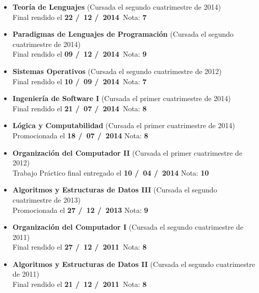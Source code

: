 \begin{itemize}[leftmargin=0.8cm]
  \item{\textbf{Teoría de Lenguajes} (Cursada el segundo cuatrimestre de 2014)\\
  Final rendido el \textbf{22 \slash \ 12 \slash \ 2014}\  \hfill Nota: \textbf{7}}

  \item{\textbf{Paradigmas de Lenguajes de Programación} (Cursada el segundo cuatrimestre de 2014)\\
  Final rendido el \textbf{09 \slash \ 12 \slash \ 2014}\  \hfill Nota: \textbf{9}}

  \item{\textbf{Sistemas Operativos} (Cursada el segundo cuatrimestre de 2012)\\
  Final rendido el \textbf{10 \slash \ 09 \slash \ 2014}\  \hfill Nota: \textbf{7}}

  \item{\textbf{Ingeniería de Software I} (Cursada el primer cuatrimestre de 2014)\\
  Final rendido el \textbf{21 \slash \ 07 \slash \ 2014}\  \hfill Nota: \textbf{8}}

  \item{\textbf{Lógica y Computabilidad} (Cursada el primer cuatrimestre de 2014)\\
  Promocionada el \textbf{18 \slash \ 07 \slash \ 2014} \hfill Nota: \textbf{8}}

  \item{\textbf{Organización del Computador II} (Cursada el primer cuatrimestre de 2012)\\
  Trabajo Práctico final entregado el \textbf{10 \slash \ 04 \slash \ 2014} \hfill Nota: \textbf{10}}

  \item{\textbf{Algoritmos y Estructuras de Datos III} (Cursada el segundo cuatrimestre de 2013)\\
  Promocionada el \textbf{27 \slash \ 12 \slash \ 2013} \hfill Nota: \textbf{9}}

  \item{\textbf{Organización del Computador I} (Cursada el segundo cuatrimestre de 2011)\\
  Final rendido el \textbf{27 \slash \ 12 \slash \ 2011}\  \hfill Nota: \textbf{8}}

  \item{\textbf{Algoritmos y Estructuras de Datos II} (Cursada el segundo cuatrimestre de 2011)\\
  Final rendido el \textbf{21 \slash \ 12 \slash \ 2011}\  \hfill Nota: \textbf{8}}


\end{itemize}
